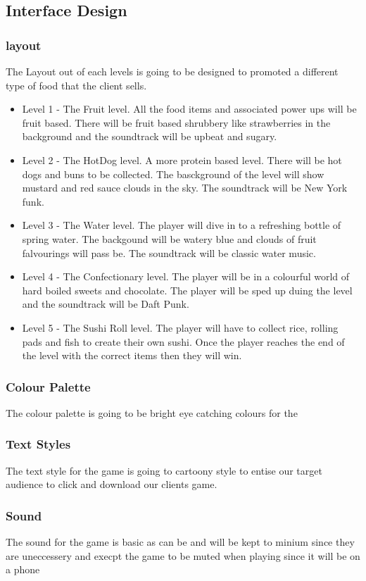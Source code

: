 \documentclass{article}
\begin{document}
\subsection{Interface Design}
\subsubsection{layout}
The Layout out of each levels is going to be designed to promoted a different type of food that the client sells. 
\begin{itemize}
	\item Level 1 - The Fruit level. All the food items and associated power ups will be fruit based. There will be fruit based shrubbery like strawberries in the background and the soundtrack will be upbeat and sugary.
	\item Level 2 - The HotDog level. A more protein based level. There will be hot dogs and buns to be collected. The basckground of the level will show mustard and red sauce clouds in the sky. The soundtrack will be New York funk.
	\item Level 3 - The Water level. The player will dive in to a refreshing bottle of spring water. The backgound will be watery blue and clouds of fruit falvourings will pass be. The soundtrack will be classic water music.
	\item Level 4 - The Confectionary level. The player will be in a colourful world of hard boiled sweets and chocolate. The player will be sped up duing the level and the soundtrack will be Daft Punk.
	\item Level 5 - The Sushi Roll level. The player will have to collect rice, rolling pads and fish to create their own sushi. Once the player reaches the end of the level with the correct items then they will win.
\end{itemize}

\subsubsection{Colour Palette}
The colour palette is going to be bright eye catching colours for the  

\subsubsection{Text Styles}
The text style for the game is going to cartoony style to entise our target audience to click and download our clients game. 

\subsubsection{Sound}
The sound for the game is basic as can be and will be kept to minium since they are uneccessery and execpt the game to be muted when playing since it will be on a phone
\end{document}
